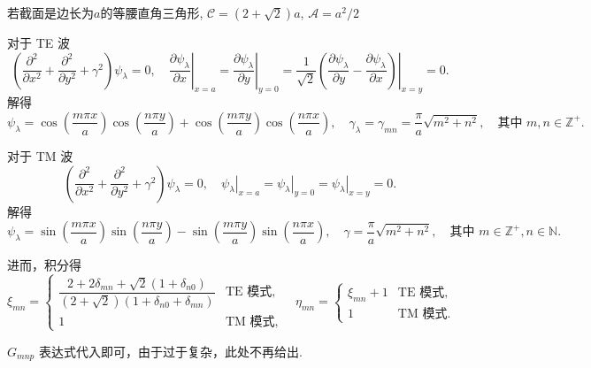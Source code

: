 \begin{example}
	若截面是边长为\(a\)的等腰直角三角形,  \(\mathcal{C} = (2 + \sqrt{2})a\), \(\mathcal{A} = a^2/2\)

	对于 TE 波
	\begin{equation*}
		\left( \dfrac{\partial^2}{\partial x^2} + \dfrac{\partial^2}{\partial y^2} + \gamma^2 \right) \psi_\lambda = 0, \quad \left. \dfrac{\partial \psi_\lambda}{\partial x} \right|_{x=a} = \left. \dfrac{\partial \psi_\lambda}{\partial y} \right|_{y=0} = \left. \dfrac{1}{\sqrt{2}} \left( \dfrac{\partial \psi_\lambda}{\partial y} - \dfrac{\partial \psi_\lambda}{\partial x} \right) \right|_{x=y} = 0.
	\end{equation*}
	解得
	\begin{equation*}
		\psi_\lambda = \cos\left( \dfrac{m\pi x}{a} \right) \cos\left( \dfrac{n\pi y}{a} \right) + \cos\left( \dfrac{m\pi y}{a} \right) \cos\left( \dfrac{n\pi x}{a} \right), \quad \gamma_\lambda = \gamma_{mn} = \dfrac{\pi}{a} \sqrt{m^2 + n^2}, \quad \text{其中 } m, n \in \mathbb{Z}^+.
	\end{equation*}

	对于 TM 波
	\begin{equation*}
		\left( \dfrac{\partial^2}{\partial x^2} + \dfrac{\partial^2}{\partial y^2} + \gamma^2 \right) \psi_\lambda = 0, \quad \left. \psi_\lambda \right|_{x=a} = \left. \psi_\lambda \right|_{y=0} = \left. \psi_\lambda \right|_{x=y} = 0.
	\end{equation*}
	解得
	\begin{equation*}
		\psi_\lambda = \sin\left( \dfrac{m\pi x}{a} \right) \sin\left( \dfrac{n\pi y}{a} \right) - \sin\left( \dfrac{m\pi y}{a} \right) \sin\left( \dfrac{n\pi x}{a} \right), \quad \gamma = \dfrac{\pi}{a} \sqrt{m^2 + n^2}, \quad \text{其中 } m \in \mathbb{Z}^+, n \in \mathbb{N}.
	\end{equation*}

	进而，积分得
	\begin{equation*}
		\xi_{mn} =
		\begin{cases}
			\dfrac{2 + 2\delta_{mn} + \sqrt{2} \left( 1 + \delta_{n0} \right)}{\left( 2 + \sqrt{2} \right) \left( 1 + \delta_{n0} + \delta_{mn} \right)} & \text{TE 模式}, \\[8pt]
			1                                                                                                                                            & \text{TM 模式},
		\end{cases}
		\quad
		\eta_{mn} =
		\begin{cases}
			\xi_{mn} + 1 & \text{TE 模式}, \\[8pt]
			1            & \text{TM 模式}.
		\end{cases}
	\end{equation*}

	\(G_{mnp}\) 表达式代入即可，由于过于复杂，此处不再给出.
\end{example}

